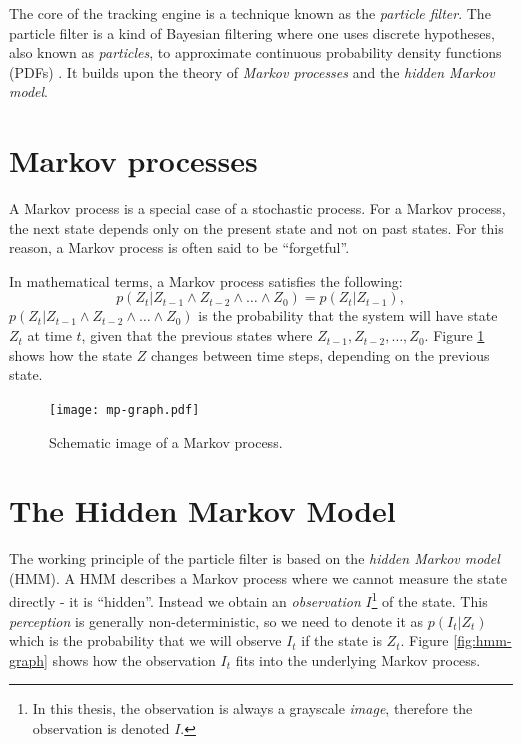 The core of the tracking engine is a technique known as the
\emph{particle filter}.  The particle filter is a kind of Bayesian
filtering where one uses discrete hypotheses, also known as
\emph{particles}, to approximate continuous probability density
functions (PDFs) \cite{ProbRob}.  It builds upon the theory of
\emph{Markov processes} and the \emph{hidden Markov model}.

\section{Markov processes} A Markov process is a special case of a
stochastic process. For a Markov process, the next state depends only
on the present state and not on past states.  For this reason, a
Markov process is often said to be ``forgetful''.

In mathematical terms, a Markov process satisfies the following:
\begin{equation} p\left(Z_t|Z_{t-1} \wedge Z_{t-2} \wedge \dots \wedge
Z_0\right) = p\left(Z_t|Z_{t-1}\right),
\end{equation} $p\left(Z_t|Z_{t-1} \wedge Z_{t-2} \wedge \dots \wedge
Z_0\right)$ is the probability that the system will have state $Z_t$
at time $t$, given that the previous states where $Z_{t-1},
Z_{t-2},\dots, Z_0$. Figure \ref{fig:mp-graph} shows how the state $Z$
changes between time steps, depending on the previous state.

\begin{figure}
  \centering
  \texttt{[image: mp-graph.pdf]}
  \caption{Schematic image of a Markov process.}
  \label{fig:mp-graph}
\end{figure}

\section{The Hidden Markov Model}

The working principle of the particle filter is based on the
\emph{hidden Markov model} (HMM).  A HMM describes a Markov process
where we cannot measure the state directly - it is
``hidden''\cite{EncyclopediaMachineLearning}.  Instead we obtain an
\emph{observation} $I$\footnote{In this thesis, the observation is
  always a grayscale \emph{image}, therefore the observation is
  denoted $I$.}  of the state. This \emph{perception} is generally
non-deterministic, so we need to denote it as $p(I_t|Z_t)$ which is
the probability that we will observe $I_t$ if the state is
$Z_t$. Figure \ref{fig:hmm-graph} shows how the observation $I_t$ fits
into the underlying Markov process.

